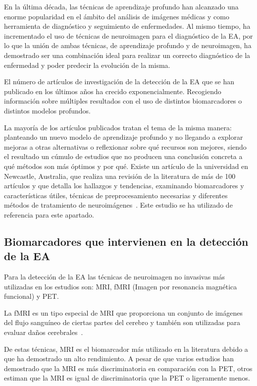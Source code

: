 En la última década, las técnicas de aprendizaje profundo han alcanzado una enorme popularidad en el ámbito del análisis
de imágenes médicas y como herramienta de diagnóstico y seguimiento de enfermedades.
Al mismo tiempo, ha incrementado el uso de técnicas de neuroimagen para el diagnóstico de la EA, por lo que la unión de
ambas técnicas, de aprendizaje profundo y de neuroimagen, ha demostrado ser una combinación ideal para realizar un
correcto diagnóstico de la enfermedad y poder predecir la evolución de la misma.

El número de artículos de investigación de la detección de la EA que se han publicado en los últimos años ha crecido
exponencialmente.
Recogiendo información sobre múltiples resultados con el uso de distintos biomarcadores o distintos modelos profundos.

La mayoría de los artículos publicados tratan el tema de la misma manera: planteando un nuevo modelo de aprendizaje
profundo y no llegando a explorar mejoras a otras alternativas o reflexionar sobre qué recursos son mejores, siendo el
resultado un cúmulo de estudios que no producen una conclusión concreta a qué métodos son más óptimos y por qué.
Existe un artículo de la universidad en Newcastle, Australia, que realiza una revisión de la literatura de más de 100
artículos y que detalla los hallazgos y tendencias, examinando biomarcadores y características útiles, técnicas de
preprocesamiento necesarias y diferentes métodos de tratamiento de neuroimágenes~\cite{literature-review}.
Este estudio se ha utilizado de referencia para este apartado.

\subsection{Biomarcadores que intervienen en la detección de la EA}\label{subsec:biomarcadores-estado-del-arte}
Para la detección de la EA las técnicas de neuroimagen no invasivas más utilizadas en los estudios son: MRI, fMRI
(Imagen por resonancia magnética funcional)  y PET.

La fMRI es un tipo especial de MRI que proporciona un conjunto de imágenes del flujo sanguíneo de ciertas partes del
cerebro y también son utilizadas para evaluar daños cerebrales~\cite{mayo-clinic-mri}.

De estas técnicas, MRI es el biomarcador más utilizado en la literatura debido a que ha demostrado un alto rendimiento.
A pesar de que varios estudios han demostrado que la MRI es más discriminatoria en comparación con la PET, otros estiman
que la MRI es igual de discriminatoria que la PET o ligeramente menos.


